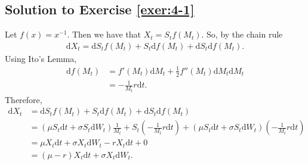 \documentclass[12pt]{book}
\numberwithin{equation}{chapter}
\theoremstyle{plain}
\numberwithin{theorem}{section}
\theoremstyle{definition}
\numberwithin{exercise}{chapter}
\newcommand{\<}{\langle}
\renewcommand{\>}{\rangle}
\renewcommand{\(}{\left(}
\renewcommand{\)}{\right)}
\renewcommand{\[}{\left[}
\renewcommand{\]}{\right]}
\newcommand\sig{\sigma}
\newcommand\dd{\mathrm{d}}
\theoremstyle{definition}
\numberwithin{question}{section}
\begin{document}
\subsection*{Solution to Exercise \ref{exer:4-1}}
Let $f(x) = x^{-1}$. Then we have that $X_t = S_t f(M_t)$. So, by the chain rule
\begin{align}
\dd X_t
	= \dd S_t f(M_t) + S_t  \dd f(M_t) + \dd S_t  \dd f(M_t). 
\end{align}
Using Ito's Lemma,
\begin{align}
\dd f(M_t)
	&= f' (M_t) \dd M_t + \frac 12 f''(M_t) \dd M_t \dd M_t \\ 
	&= - \frac 1{M_t} r\dd t.
\end{align}
Therefore, 
\begin{align}
\dd X_t
	&= \dd S_t f(M_t) + S_t  \dd f(M_t) + \dd S_t  \dd f(M_t) \\
	&= \( \mu S_t \dd t + \sig S_t \dd W_t \) \frac{1}{M_t} + S_t \( - \frac 1{M_t} r \dd t\) 
		+ \( \mu S_t \dd t + \sig S_t \dd W_t \)\( - \frac 1{M_t} r \dd t\) \\
	&=  \mu X_t \dd t + \sig X_t \dd W_t  - r X_t \dd t 
		+0 \\
	&= \( \mu - r\) X_t \dd t + \sig X_t \dd W_t. 
\end{align}

\end{document}
